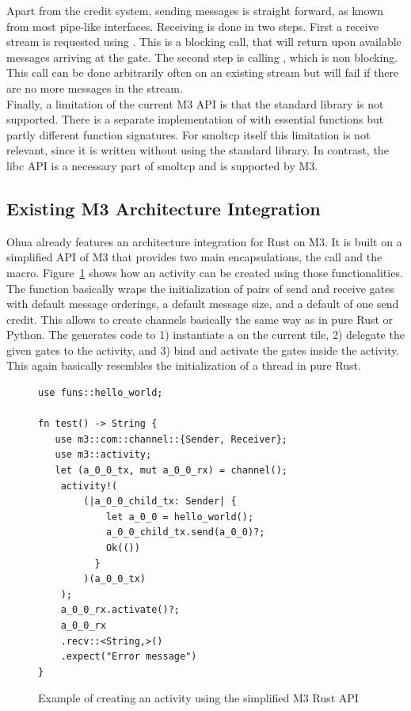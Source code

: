 Apart from the credit system, sending messages is straight forward, as known from most pipe-like interfaces. Receiving is done in two steps. First a receive stream is requested using . This is a blocking call, that will return upon available messages arriving at the gate. The second step is calling , which is non blocking. This call can be done arbitrarily often on an existing stream but will fail if there are no more messages in the stream.\\

Finally, a limitation of the current M3 API is that the standard library is not supported. There is a separate implementation of  with essential functions but partly different function signatures. For smoltcp itself this limitation is not relevant, since it is written without using the standard library. In contrast, the libc API is a necessary part of smoltcp and is supported by M3. 

\subsection{Existing M3 Architecture Integration}
Ohua already features an architecture integration for Rust on M3. It is built on a simplified API of M3 that provides two main encapsulations, the  call and the  macro. Figure~\ref{fig:OhuaM3Wrapper} shows how an activity can be created using those functionalities. The function  basically wraps the initialization of pairs of send and receive gates with default message orderings, a default message size, and a default of one send credit. This allows to create channels basically the same way as in pure Rust or Python. The  generates code to 1) instantiate a  on the current tile, 2) delegate the given gates to the activity, and 3) bind and activate the gates inside the activity. This again basically resembles the initialization of a thread in pure Rust. 


\begin{figure}
    \centering
    \begin{verbatim}
use funs::hello_world;

fn test() -> String {
   use m3::com::channel::{Sender, Receiver};
   use m3::activity;
   let (a_0_0_tx, mut a_0_0_rx) = channel(); 
    activity!(
        (|a_0_0_child_tx: Sender| {    
            let a_0_0 = hello_world();
            a_0_0_child_tx.send(a_0_0)?;
            Ok(())
          }
        )(a_0_0_tx)
    );
    a_0_0_rx.activate()?;
    a_0_0_rx
    .recv::<String,>()
    .expect("Error message")
}

    \end{verbatim}
    \caption{Example of creating an activity using the simplified M3 Rust API}
    \label{fig:OhuaM3Wrapper}
\end{figure}

